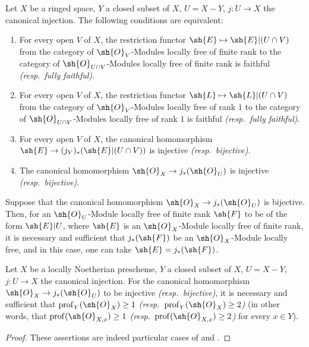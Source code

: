\begin{corollary}[21.13.3]
\label{IV.21.13.3}
Let $X$ be a ringed space, $Y$ a closed subset of $X$, $U=X-Y$, $j:U\to X$ the canonical injection.
The following conditions are equivalent:
\begin{enumerate}
  \item[a)] For every open $V$ of $X$, the restriction functor $\sh{E}\mapsto\sh{E}|(U\cap V)$ from the category of $\sh{O}_V$-Modules locally free of finite rank to the category of $\sh{O}_{U\cap V}$-Modules locally free of finite rank is faithful \emph{(resp.\ fully faithful)}.
  \item[a${}'$)] For every open $V$ of $X$, the restriction functor $\sh{L}\mapsto\sh{L}|(U\cap V)$ from the category of $\sh{O}_V$-Modules locally free of rank $1$ to the category of $\sh{O}_{U\cap V}$-Modules locally free of rank $1$ is faithful \emph{(resp.\ fully faithful)}.
  \item[b)] For every open $V$ of $X$, the canonical homomorphism $\sh{E}\to(j_V)_*(\sh{E}|(U\cap V))$ is injective \emph{(resp.\ bijective)}.
  \item[b${}'$)] The canonical homomorphism $\sh{O}_X\to j_*(\sh{O}_U)$ is injective \emph{(resp.\ bijective)}.
\end{enumerate}

Suppose that the canonical homomorphism $\sh{O}_X\to j_*(\sh{O}_U)$ is bijective.
Then, for an $\sh{O}_U$-Module locally free of finite rank $\sh{F}$ to be of the form $\sh{E}|U$, where $\sh{E}$ is an $\sh{O}_X$-Module locally free of finite rank, it is necessary and sufficient that $j_*(\sh{F})$ be an $\sh{O}_X$-Module locally free, and in this case, one can take $\sh{E}=j_*(\sh{F})$.
\end{corollary}

\begin{lemma}[21.13.4]
\label{IV.21.13.4}
Let $X$ be a locally Noetherian prescheme, $Y$ a closed subset of $X$, $U=X-Y$, $j:U\to X$ the canonical injection.
For the canonical homomorphism $\sh{O}_X\to j_*(\sh{O}_U)$ to be injective \emph{(resp.\ bijective)}, it is necessary and sufficient that $\operatorname{prof}_Y(\sh{O}_X)\geq 1$ \emph{(resp.\ $\operatorname{prof}_Y(\sh{O}_X)\geq 2$)} (in other words, that $\operatorname{prof}(\sh{O}_{X,x})\geq 1$ \emph{(resp.\ $\operatorname{prof}(\sh{O}_{X,x})\geq 2$)} for every $x\in Y$).
\end{lemma}

\begin{proof}
These assertions are indeed particular cases of  and .
\end{proof}

